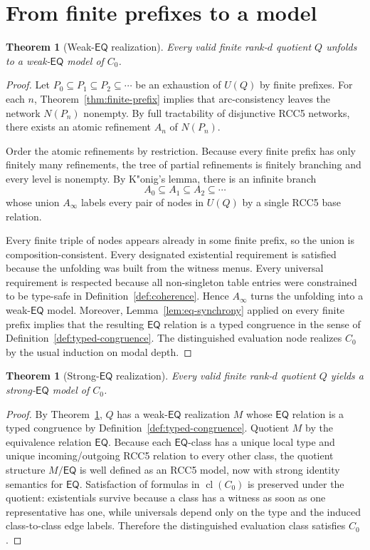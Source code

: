\documentclass[11pt]{article}
\newtheorem{theorem}[definition]{Theorem}
\theoremstyle{remark}
\newcommand{\EQ}{\mathsf{EQ}}
\newcommand{\cl}{\operatorname{cl}}
\begin{document}
\section{From finite prefixes to a model}

\begin{theorem}[Weak-$\EQ$ realization]\label{thm:weak-model}
Every valid finite rank-$d$ quotient $Q$ unfolds to a weak-$\EQ$ model of $C_0$.
\end{theorem}

\begin{proof}
Let $P_0\subseteq P_1\subseteq P_2\subseteq\cdots$ be an exhaustion of $U(Q)$ by finite prefixes. For each $n$, Theorem~\ref{thm:finite-prefix} implies that arc-consistency leaves the network $N(P_n)$ nonempty. By full tractability of disjunctive RCC5 networks, there exists an atomic refinement $A_n$ of $N(P_n)$.

Order the atomic refinements by restriction. Because every finite prefix has only finitely many refinements, the tree of partial refinements is finitely branching and every level is nonempty. By K"onig's lemma, there is an infinite branch
\[
A_0\subseteq A_1\subseteq A_2\subseteq\cdots
\]
whose union $A_\infty$ labels every pair of nodes in $U(Q)$ by a single RCC5 base relation.

Every finite triple of nodes appears already in some finite prefix, so the union is composition-consistent. Every designated existential requirement is satisfied because the unfolding was built from the witness menus. Every universal requirement is respected because all non-singleton table entries were constrained to be type-safe in Definition~\ref{def:coherence}. Hence $A_\infty$ turns the unfolding into a weak-$\EQ$ model. Moreover, Lemma~\ref{lem:eq-synchrony} applied on every finite prefix implies that the resulting $\EQ$ relation is a typed congruence in the sense of Definition~\ref{def:typed-congruence}. The distinguished evaluation node realizes $C_0$ by the usual induction on modal depth.
\end{proof}

\begin{theorem}[Strong-$\EQ$ realization]\label{thm:strong-model}
Every valid finite rank-$d$ quotient $Q$ yields a strong-$\EQ$ model of $C_0$.
\end{theorem}

\begin{proof}
By Theorem~\ref{thm:weak-model}, $Q$ has a weak-$\EQ$ realization $M$ whose $\EQ$ relation is a typed congruence by Definition~\ref{def:typed-congruence}. Quotient $M$ by the equivalence relation $\EQ$. Because each $\EQ$-class has a unique local type and unique incoming/outgoing RCC5 relation to every other class, the quotient structure $M/{\EQ}$ is well defined as an RCC5 model, now with strong identity semantics for $\EQ$. Satisfaction of formulas in $\cl(C_0)$ is preserved under the quotient: existentials survive because a class has a witness as soon as one representative has one, while universals depend only on the type and the induced class-to-class edge labels. Therefore the distinguished evaluation class satisfies $C_0$.
\end{proof}
\end{document}

